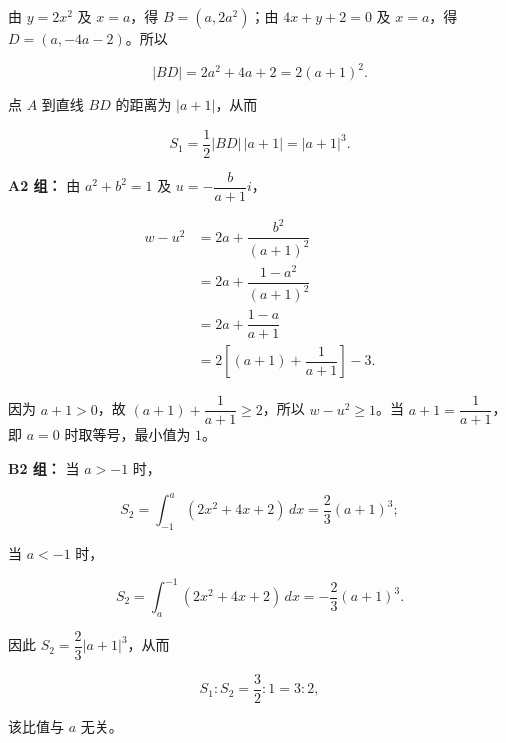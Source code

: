 \begin{answer}
由 $y=2x^2$ 及 $x=a$，得 $B=(a,2a^2)$；由 $4x+y+2=0$ 及 $x=a$，得 $D=(a,-4a-2)$。所以

\nopagebreak[4]
\[
|BD|=2a^2+4a+2=2(a+1)^2.
\]

点 $A$ 到直线 $BD$ 的距离为 $|a+1|$，从而

\nopagebreak[4]
\[
S_1=\dfrac12|BD|\,|a+1|=|a+1|^3.
\]


\textbf{A2 组：} 由 $a^2+b^2=1$ 及 $u=-\dfrac{b}{a+1}i$，

\nopagebreak[4]
\[
\begin{aligned}
w-u^2
&=2a+\dfrac{b^2}{(a+1)^2}\\
&=2a+\dfrac{1-a^2}{(a+1)^2}\\
&=2a+\dfrac{1-a}{a+1}\\
&=2\left[(a+1)+\dfrac1{a+1}\right]-3.
\end{aligned}
\]

因为 $a+1>0$，故 $(a+1)+\dfrac1{a+1}\ge2$，所以 $w-u^2\ge1$。当 $a+1=\dfrac1{a+1}$，即 $a=0$ 时取等号，最小值为 $1$。

\textbf{B2 组：} 当 $a>-1$ 时，

\nopagebreak[4]
\[
S_2=\int_{-1}^{a}(2x^2+4x+2)\,dx=\dfrac23(a+1)^3;
\]

当 $a<-1$ 时，

\nopagebreak[4]
\[
S_2=\int_{a}^{-1}(2x^2+4x+2)\,dx=-\dfrac23(a+1)^3.
\]

因此 $S_2=\dfrac23|a+1|^3$，从而

\nopagebreak[4]
\[
S_1:S_2=\dfrac32:1=3:2,
\]

该比值与 $a$ 无关。




\end{answer}
